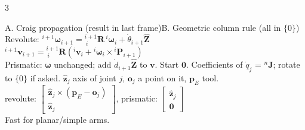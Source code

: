 \begin{multicols}{3}
\begin{twoway}{A. Craig propagation (result in last frame)}{B. Geometric column rule (all in $\{0\}$)}
Revolute: ${}^{i+1}\boldsymbol\omega_{i+1}={}^{i+1}_{\ i}\mathbf R\,{}^i\boldsymbol\omega_i+\dot\theta_{i+1}\hat{\mathbf Z}$\\
${}^{i+1}\mathbf v_{i+1}={}^{i+1}_{\ i}\mathbf R({}^i\mathbf v_i+{}^i\boldsymbol\omega_i\times{}^i\mathbf P_{i+1})$\\
Prismatic: $\boldsymbol\omega$ unchanged; add $\dot d_{i+1}\hat{\mathbf Z}$ to $\mathbf v$. Start $\mathbf 0$. Coefficients of $\dot q_j$ = ${}^n\mathbf J$; rotate to $\{0\}$ if asked.
\tcblower
$\hat{\mathbf z}_j$ axis of joint $j$, $\mathbf o_j$ a point on it, $\mathbf p_E$ tool.\\
revolute: $\begin{bmatrix}\hat{\mathbf z}_j\times(\mathbf p_E-\mathbf o_j)\\\hat{\mathbf z}_j\end{bmatrix}$, prismatic: $\begin{bmatrix}\hat{\mathbf z}_j\\\mathbf 0\end{bmatrix}$\\
Fast for planar/simple arms.
\end{twoway}


\end{multicols}
